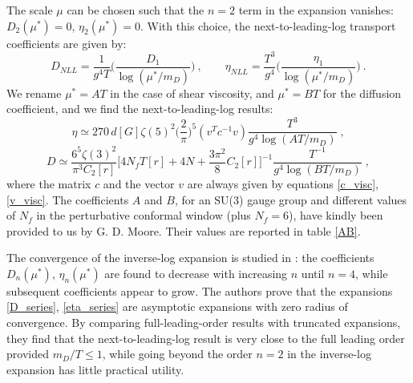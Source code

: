 The scale $\mu$ can be chosen such that the $n=2$ term in the expansion vanishes: $D_2(\mu^*) = 0$, $\eta_2(\mu^*) =0$. With this choice, the next-to-leading-log transport coefficients are given by:
\begin{equation}
D_{NLL} = \frac{1}{g^4 T} \biggl( \frac{D_1}{ \log(\mu^*/m_D)} \biggr) \: , \qquad
\eta_{NLL} = \frac{T^3}{g^4} \biggl( \frac{\eta_1}{ \log(\mu^*/m_D)} \biggr) \: .
\end{equation} 
%
We rename $\mu^* = AT$ in the case of shear viscosity, and $\mu^* = BT$ for the diffusion coefficient, and we find the next-to-leading-log results:
 \begin{equation}   
\eta \simeq 270 \, d [G] \zeta(5)^2 \biggl( \frac{2}{\pi} \biggr)^5 (v^T c^{-1} v) \frac{T^3}{g^4 \log( AT/m_D)} \; ,
\label{eta_NLL}
\end{equation}
\begin{equation}
D \simeq \frac{6^5 \zeta(3)^2}{\pi^3 C_2[r]} \biggl[ 4 N_f T[r] + 4 N + \frac{3 \pi^2}{8} C_2[r] \biggr]^{-1} 
 \frac{T^{-1}}{g^4\log(BT/m_D)} \; ,
 \label{D_NLL}
\end{equation}
%
where the matrix $c$ and the vector $v$ are always given by equations \ref{c_visc}, \ref{v_visc}. The coefficients $A$ and $B$, for an SU(3) gauge group and different values of $N_f$ in the perturbative conformal window (plus $N_f = 6$), have kindly been provided to us by G. D. Moore. Their values are reported in table \ref{AB}.

The convergence of the inverse-log expansion is studied in \cite{Arnold:2003zc}: the coefficients $D_n(\mu^*)$, $\eta_n(\mu^*)$ are found to decrease with increasing $n$ until $n=4$, while subsequent coefficients appear to grow. The authors prove that the expansions \ref{D_series}, \ref{eta_series} are asymptotic expansions with zero radius of convergence. By comparing full-leading-order results with truncated expansions, they find that the next-to-leading-log result is very close to the full leading order provided $m_D/T \leq 1$, while going beyond the order $n=2$ in the inverse-log expansion has little practical utility.

